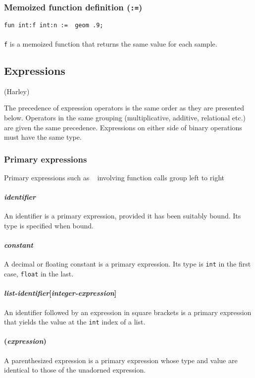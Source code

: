 \subsubsection{Memoized function definition (\texttt{:=})}
\texttt{fun int:f int:n := ~geom .9;}\\
\\
\texttt{f} is a memoized function that returns the same value for each sample.

\subsection{Expressions}
(Harley)

The precedence of expression operators is the same order as they are presented below. Operators in the same grouping (multiplicative, additive, relational etc.) are given the same precedence. Expressions on either side of binary operations must have the same type. 

\subsubsection{Primary expressions}
Primary expressions such as ~ involving function calls group left to right

\paragraph{\textit{identifier}}
An identifier is a primary expression, provided it has been suitably bound. Its type is specified when bound. 

\paragraph{\textit{constant}}
A decimal or floating constant is a primary expression. Its type is \texttt{int} in the first case, \texttt{float} in the last. 

\paragraph{\textit{list-identifier}[\textit{integer-expression}]}
An identifier followed by an expression in square brackets is a primary expression that yields the value at the \texttt{int}  index of a list.

\paragraph{(\textit{expression})}
A parenthesized expression is a primary expression whose type and value are identical to those of the unadorned expression. 



